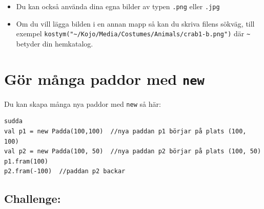 \begin{itemize}

\item {Du kan också använda dina egna bilder av typen \lstinline{.png} eller \lstinline{.jpg}}
\item {Om du vill lägga bilden i en annan mapp så kan du skriva filens sökväg, till exempel \lstinline{kostym("~/Kojo/Media/Costumes/Animals/crab1-b.png")} där \lstinline{~} betyder din hemkatalog.}

\end{itemize}


\chapter{Gör många paddor med \lstinline{new}}Du kan skapa många nya paddor med \lstinline{new} så här:

\begin{lstlisting}[basicstyle={\ttfamily\fontsize{18}{22}\selectfont},numbers=none]
sudda
val p1 = new Padda(100,100)  //nya paddan p1 börjar på plats (100, 100)
val p2 = new Padda(100, 50)  //nya paddan p2 börjar på plats (100, 50)
p1.fram(100)
p2.fram(-100)  //paddan p2 backar
\end{lstlisting}
        

  
\section*{\color{BrickRed}Challenge:}


